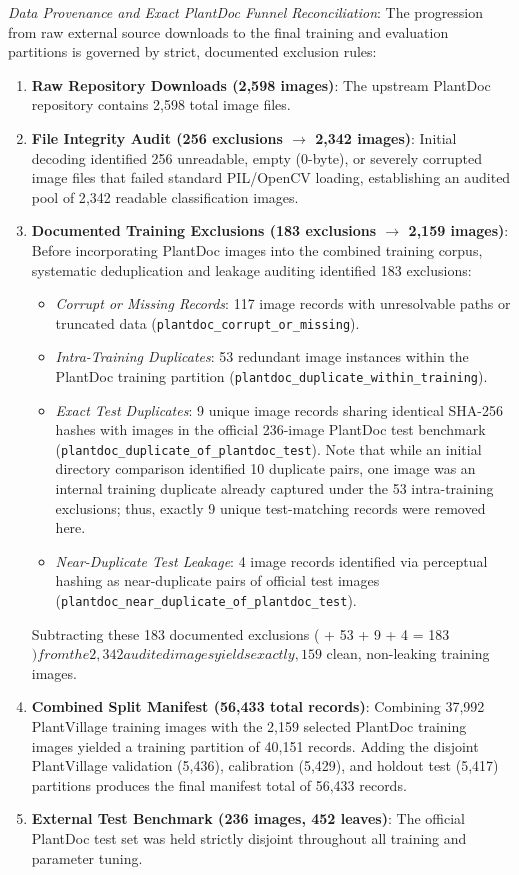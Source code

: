 \documentclass[pdflatex,sn-mathphys-num]{sn-jnl}
\theoremstyle{thmstyleone}%
\theoremstyle{thmstyletwo}%
\theoremstyle{thmstylethree}%
\begin{document}
\noindent\textit{Data Provenance and Exact PlantDoc Funnel Reconciliation}:
The progression from raw external source downloads to the final training and evaluation partitions is governed by strict, documented exclusion rules:
\begin{enumerate}
  \item \textbf{Raw Repository Downloads (2{,}598 images)}: The upstream PlantDoc repository \citep{singh2020plant} contains 2{,}598 total image files.
  \item \textbf{File Integrity Audit (256 exclusions $\rightarrow$ 2{,}342 images)}: Initial decoding identified 256 unreadable, empty (0-byte), or severely corrupted image files that failed standard PIL/OpenCV loading, establishing an audited pool of 2{,}342 readable classification images.
  \item \textbf{Documented Training Exclusions (183 exclusions $\rightarrow$ 2{,}159 images)}: Before incorporating PlantDoc images into the combined training corpus, systematic deduplication and leakage auditing identified 183 exclusions:
  \begin{itemize}
    \item \textit{Corrupt or Missing Records}: 117 image records with unresolvable paths or truncated data (\texttt{plantdoc\_corrupt\_or\_missing}).
    \item \textit{Intra-Training Duplicates}: 53 redundant image instances within the PlantDoc training partition (\texttt{plantdoc\_duplicate\_within\_training}).
    \item \textit{Exact Test Duplicates}: 9 unique image records sharing identical SHA-256 hashes with images in the official 236-image PlantDoc test benchmark (\texttt{plantdoc\_duplicate\_of\_plantdoc\_test}). Note that while an initial directory comparison identified 10 duplicate pairs, one image was an internal training duplicate already captured under the 53 intra-training exclusions; thus, exactly 9 unique test-matching records were removed here.
    \item \textit{Near-Duplicate Test Leakage}: 4 image records identified via perceptual hashing as near-duplicate pairs of official test images (\texttt{plantdoc\_near\_duplicate\_of\_plantdoc\_test}).
  \end{itemize}
  Subtracting these 183 documented exclusions ( + 53 + 9 + 4 = 183$) from the 2{,}342 audited images yields exactly {,}159$ clean, non-leaking training images.
  \item \textbf{Combined Split Manifest (56{,}433 total records)}: Combining 37{,}992 PlantVillage training images with the 2{,}159 selected PlantDoc training images yielded a training partition of 40{,}151 records. Adding the disjoint PlantVillage validation (5{,}436), calibration (5{,}429), and holdout test (5{,}417) partitions produces the final manifest total of 56{,}433 records.
  \item \textbf{External Test Benchmark (236 images, 452 leaves)}: The official PlantDoc test set was held strictly disjoint throughout all training and parameter tuning.
\end{enumerate}
\end{document}
